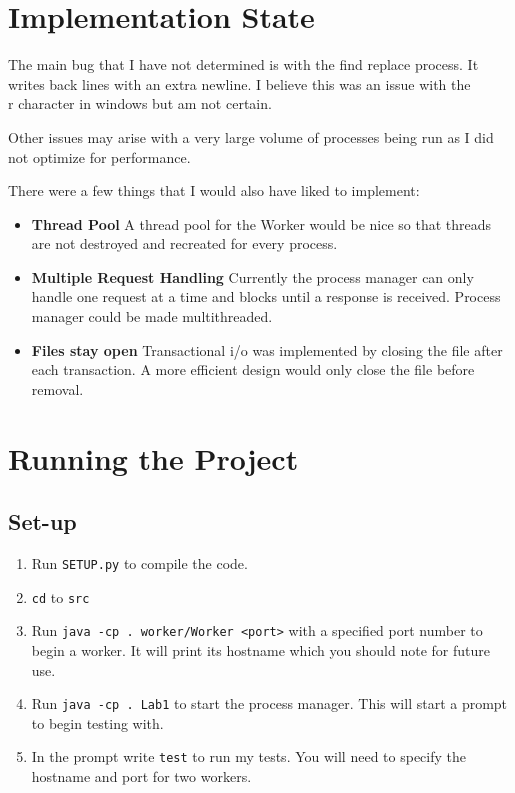 \documentclass[12pt]{article}
\begin{document}

\section{Implementation State}
The main bug that I have not determined is with the find replace process. It writes back lines with an extra newline. I believe this was an issue with the \\r character in windows but am not certain.

Other issues may arise with a very large volume of processes being run as I did not optimize for performance.

There were a few things that I would also have liked to implement:
\begin{itemize}
\item \textbf{Thread Pool} A thread pool for the Worker would be nice so that threads are not destroyed and recreated for every process.
\item \textbf{Multiple Request Handling} Currently the process manager can only handle one request at a time and blocks until a response is received. Process manager could be made multithreaded.
\item \textbf{Files stay open} Transactional i/o was implemented by closing the file after each transaction. A more efficient design would only close the file before removal.
\end{itemize}


\section{Running the Project}

\subsection{Set-up}
\begin{enumerate}
\item Run \texttt{SETUP.py} to compile the code.
\item \texttt{cd} to \texttt{src}
\item Run \texttt{java -cp . worker/Worker <port>} with a specified port number to begin a worker. It will print its hostname which you should note for future use.
\item Run \texttt{java -cp . Lab1} to start the process manager. This will start a prompt to begin testing with.
\item In the prompt write \texttt{test} to run my tests. You will need to specify the hostname and port for two workers.
\end{enumerate}
\end{document}
